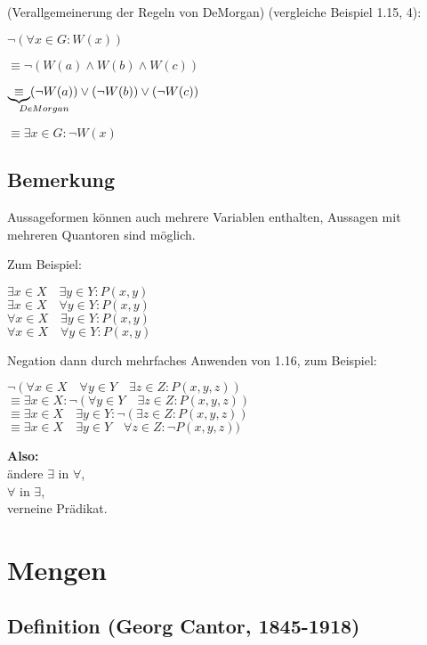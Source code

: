 \documentclass[a4paper, 12pt, twoside] {article}
\begin{document}
(Verallgemeinerung der Regeln von DeMorgan)
(vergleiche Beispiel 1.15, 4):

$\neg (\forall x \in G: W(x))$

$\equiv \neg (W(a) \wedge W(b) \wedge W(c))$

$\underbrace{\equiv}_{\mathrlap{DeMorgan}} (\neg W(a)) \lor (\neg W(b)) \lor (\neg W(c))$

$\equiv \exists x \in G: \neg W(x)$


\subsection*{Bemerkung}
Aussageformen können auch mehrere Variablen enthalten, Aussagen mit mehreren Quantoren sind möglich.

Zum Beispiel:

$\exists x \in X \quad \exists y \in Y: P(x,y)$ \\
$\exists x \in X \quad \forall y \in Y: P(x,y)$ \\
$\forall x \in X \quad \exists y \in Y: P(x,y)$ \\
$\forall x \in X \quad \forall y \in Y: P(x,y)$

Negation dann durch mehrfaches Anwenden von 1.16, zum Beispiel:

$\neg (\forall x \in X \quad \forall y \in Y \quad \exists z \in Z : P(x,y,z))$ \\
$\equiv \exists x \in X : \neg (\forall y \in Y \quad \exists z \in Z : P(x,y,z))$ \\
$\equiv \exists x \in X \quad \exists y \in Y : \neg (\exists z \in Z : P(x,y,z))$ \\
$\equiv \exists x \in X \quad \exists y \in Y \quad \forall z \in Z : \neg P(x,y,z))$

\textbf{Also: }\\
ändere $\exists$ in $\forall$, \\
\text{\qquad \quad} $\forall$ in $\exists$, \\
verneine Prädikat.

\section{Mengen} %

\subsection{Definition (Georg Cantor, 1845-1918)} %
\end{document}
